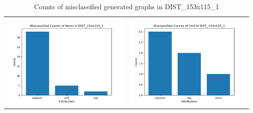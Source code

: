 \documentclass[12pt]{article}
\begin{document}
\begin{table}
\begin{center}
\begin{tabular}{ c  c }
                        \includegraphics[scale=0.63]{mis-norm-count-in-dist.png} & \includegraphics[scale=0.63]{mis-unif-count-in-dist.png} \\

                    \end{tabular}

                    \caption{Counts of misclassified generated graphs in DIST\_153x115\_1}
                    \label{mis-all-count-in-dist}

                \end{center}

            \end{table}
\end{document}

